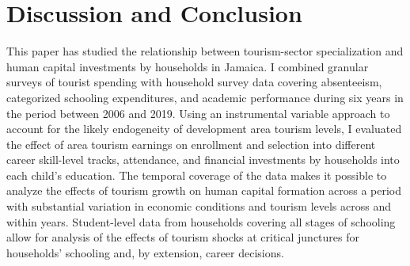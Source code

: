 \documentclass[12pt]{article}
\begin{document}
   
   
  
% 

 










	\FloatBarrier
	\section{Discussion and Conclusion}
	\label{section:conclusion}
	
	This paper has studied the relationship between tourism-sector specialization and human capital investments by households in Jamaica. I combined granular surveys of tourist spending with household survey data covering absenteeism, categorized schooling expenditures, and academic performance during six years in the period between 2006 and 2019. Using an instrumental variable approach to account for the likely endogeneity of development area tourism levels, I evaluated the effect of area tourism earnings on enrollment and selection into different career skill-level tracks, attendance, and financial investments by households into each child's education. The temporal coverage of the data makes it possible to analyze the effects of tourism growth on human capital formation across a period with substantial variation in economic conditions and tourism levels across and within years. Student-level data from households covering all stages of schooling allow for analysis of the effects of tourism shocks at critical junctures for households' schooling and, by extension, career decisions. 
	
\end{document}
